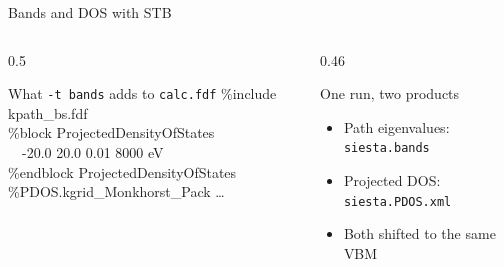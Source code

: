 \documentclass[8pt]{beamer}
\begin{document}
\begin{frame}{Bands and DOS with STB}
\begin{columns}[T]
\begin{column}{0.5\textwidth}
			\begin{block}{What \texttt{-t bands} adds to \texttt{calc.fdf}}
				\ttfamily\scriptsize
				\%include kpath\_bs.fdf\\
				\%block ProjectedDensityOfStates\\
				\ \ -20.0 20.0 0.01 8000 eV\\
				\%endblock ProjectedDensityOfStates\\
				\%PDOS.kgrid\_Monkhorst\_Pack \ldots
			\end{block}
		\end{column}
		\begin{column}{0.46\textwidth}
			\begin{alertblock}{One run, two products}
				\small
				\begin{itemize}
					\item Path eigenvalues: \texttt{siesta.bands}
					\item Projected DOS: \texttt{siesta.PDOS.xml}
					\item Both shifted to the same VBM
				\end{itemize}
			\end{alertblock}
		\end{column}
	\end{columns}
\end{frame}
\end{document}
